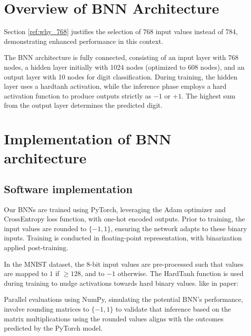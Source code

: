 \documentclass[conference]{IEEEtran}
\newcounter{todocount}
\newcommand{\todo}[1]{
  \stepcounter{todocount}
}
\begin{document}
\section{Overview of BNN Architecture}
\label{sec:overview}

Section \ref{ref:why_768} justifies the selection of 768 input values instead of 784, demonstrating enhanced performance in this context.

The BNN architecture is fully connected, consisting of an input layer with 768 nodes, a hidden layer initially with 1024 nodes (optimized to 608 nodes), and an output layer with 10 nodes for digit classification. During training, the hidden layer uses a hardtanh activation, while the inference phase employs a hard activation function to produce outputs strictly as \(-1\) or \(+1\). The highest sum from the output layer determines the predicted digit.


\section{Implementation of BNN architecture}
\label{sec:implementation}
\subsection{Software implementation}
\todo{list learning rate, batch size}

Our BNNs are trained using PyTorch\cite{paszke2019pytorch}, leveraging the Adam optimizer\cite{kingma2014adam} and CrossEntropy loss function\cite{mao2023crossentropy}, with one-hot encoded outputs. Prior to training, the input values are rounded to \(\{-1, 1\}\), ensuring the network adapts to these binary inputs. Training is conducted in floating-point representation, with binarization applied post-training.

In the MNIST dataset, the 8-bit input values are pre-processed such that values are mapped to $1$ if $\geq 128$, and to $-1$ otherwise. The HardTanh function is used during training to nudge activations towards hard binary values. like in paper: \cite{yuan2023comprehensive}

Parallel evaluations using NumPy, simulating the potential BNN's performance, involve rounding matrices to \(\{-1, 1\}\) to validate that inference based on the matrix multiplications using the rounded values aligns with the outcomes predicted by the PyTorch model.
\end{document}
